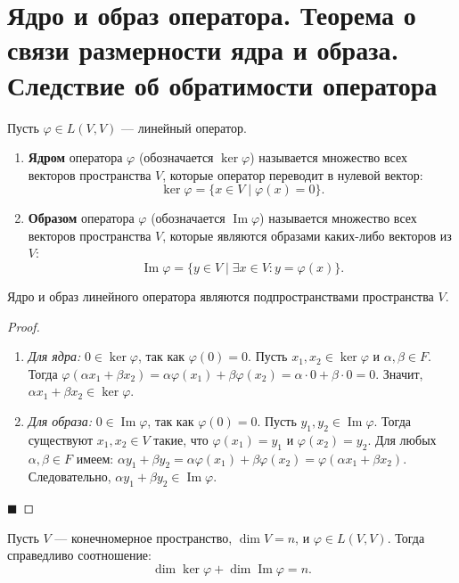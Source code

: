 \section{Ядро и образ оператора. Теорема о связи размерности ядра и образа. Следствие об обратимости оператора}

\begin{definition}
Пусть $\varphi \in L(V, V)$ --- линейный оператор. 
\begin{enumerate}
    \item \textbf{Ядром} оператора $\varphi$ (обозначается $\ker \varphi$) называется множество всех векторов пространства $V$, которые оператор переводит в нулевой вектор:
    \[
    \ker \varphi = \{ x \in V \mid \varphi(x) = 0 \}.
    \]
    \item \textbf{Образом} оператора $\varphi$ (обозначается $\operatorname{Im} \varphi$) называется множество всех векторов пространства $V$, которые являются образами каких-либо векторов из $V$:
    \[
    \operatorname{Im} \varphi = \{ y \in V \mid \exists x \in V : y = \varphi(x) \}.
    \]
\end{enumerate}
\end{definition}

\begin{theorem}
Ядро и образ линейного оператора являются подпространствами пространства $V$.
\end{theorem}

\begin{proof}
\begin{enumerate}
    \item \textit{Для ядра:} $0 \in \ker \varphi$, так как $\varphi(0) = 0$. Пусть $x_1, x_2 \in \ker \varphi$ и $\alpha, \beta \in F$. Тогда $\varphi(\alpha x_1 + \beta x_2) = \alpha \varphi(x_1) + \beta \varphi(x_2) = \alpha \cdot 0 + \beta \cdot 0 = 0$. Значит, $\alpha x_1 + \beta x_2 \in \ker \varphi$.
    \item \textit{Для образа:} $0 \in \operatorname{Im} \varphi$, так как $\varphi(0) = 0$. Пусть $y_1, y_2 \in \operatorname{Im} \varphi$. Тогда существуют $x_1, x_2 \in V$ такие, что $\varphi(x_1) = y_1$ и $\varphi(x_2) = y_2$. Для любых $\alpha, \beta \in F$ имеем: $\alpha y_1 + \beta y_2 = \alpha \varphi(x_1) + \beta \varphi(x_2) = \varphi(\alpha x_1 + \beta x_2)$. Следовательно, $\alpha y_1 + \beta y_2 \in \operatorname{Im} \varphi$.
\end{enumerate}
\hfill$\blacksquare$
\end{proof}

\begin{theorem}
Пусть $V$ --- конечномерное пространство, $\dim V = n$, и $\varphi \in L(V, V)$. Тогда справедливо соотношение:
\[
\dim \ker \varphi + \dim \operatorname{Im} \varphi = n.
\]
\end{theorem}

